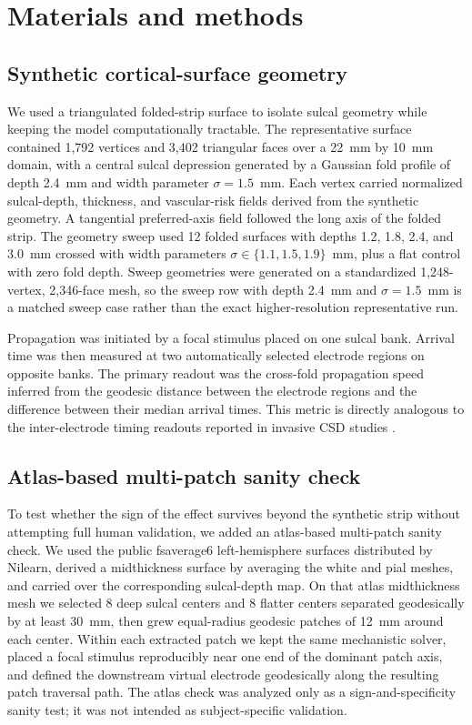 \documentclass[12pt]{article}
\begin{document}
\section{Materials and methods}

\subsection{Synthetic cortical-surface geometry}

We used a triangulated folded-strip surface to isolate sulcal geometry while keeping the model computationally tractable. The representative surface contained 1,792 vertices and 3,402 triangular faces over a 22~mm by 10~mm domain, with a central sulcal depression generated by a Gaussian fold profile of depth 2.4~mm and width parameter $\sigma=1.5$~mm. Each vertex carried normalized sulcal-depth, thickness, and vascular-risk fields derived from the synthetic geometry. A tangential preferred-axis field followed the long axis of the folded strip. The geometry sweep used 12 folded surfaces with depths 1.2, 1.8, 2.4, and 3.0~mm crossed with width parameters $\sigma \in \{1.1,1.5,1.9\}$~mm, plus a flat control with zero fold depth. Sweep geometries were generated on a standardized 1,248-vertex, 2,346-face mesh, so the sweep row with depth 2.4~mm and $\sigma=1.5$~mm is a matched sweep case rather than the exact higher-resolution representative run.

Propagation was initiated by a focal stimulus placed on one sulcal bank. Arrival time was then measured at two automatically selected electrode regions on opposite banks. The primary readout was the cross-fold propagation speed inferred from the geodesic distance between the electrode regions and the difference between their median arrival times. This metric is directly analogous to the inter-electrode timing readouts reported in invasive CSD studies \citep{Dreier2017}.

\subsection{Atlas-based multi-patch sanity check}

To test whether the sign of the effect survives beyond the synthetic strip without attempting full human validation, we added an atlas-based multi-patch sanity check. We used the public fsaverage6 left-hemisphere surfaces distributed by Nilearn, derived a midthickness surface by averaging the white and pial meshes, and carried over the corresponding sulcal-depth map. On that atlas midthickness mesh we selected 8 deep sulcal centers and 8 flatter centers separated geodesically by at least 30~mm, then grew equal-radius geodesic patches of 12~mm around each center. Within each extracted patch we kept the same mechanistic solver, placed a focal stimulus reproducibly near one end of the dominant patch axis, and defined the downstream virtual electrode geodesically along the resulting patch traversal path. The atlas check was analyzed only as a sign-and-specificity sanity test; it was not intended as subject-specific validation.
\end{document}
